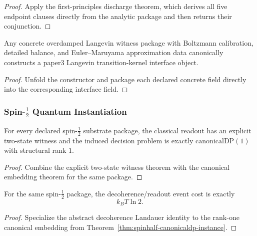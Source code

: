 \begin{proof}
Apply the first-principles discharge theorem, which derives all five endpoint clauses directly from the analytic package and then returns their conjunction.
\end{proof}

\begin{theorem}\label{thm:concrete-langevin-interface-constructor}
Any concrete overdamped Langevin witness package with Boltzmann calibration, detailed balance, and Euler--Maruyama approximation data canonically constructs a paper3 Langevin transition-kernel interface object.
\end{theorem}

\begin{proof}
Unfold the constructor and package each declared concrete field directly into the corresponding interface field.
\end{proof}

\subsubsection{Spin-$\tfrac12$ Quantum Instantiation}

\begin{theorem}\label{thm:spinhalf-canonicaldp-instance}
For every declared spin-$\tfrac12$ substrate package, the classical readout has an explicit two-state witness and the induced decision problem is exactly $\mathrm{canonicalDP}(1)$ with structural rank $1$.
\end{theorem}

\begin{proof}
Combine the explicit two-state witness theorem with the canonical embedding theorem for the same package.
\end{proof}

\begin{theorem}\label{thm:spinhalf-decoherence-floor}
For the same spin-$\tfrac12$ package, the decoherence/readout event cost is exactly
\[
k_B T\ln 2.
\]
\end{theorem}

\begin{proof}
Specialize the abstract decoherence Landauer identity to the rank-one canonical embedding from Theorem~\ref{thm:spinhalf-canonicaldp-instance}.
\end{proof}

